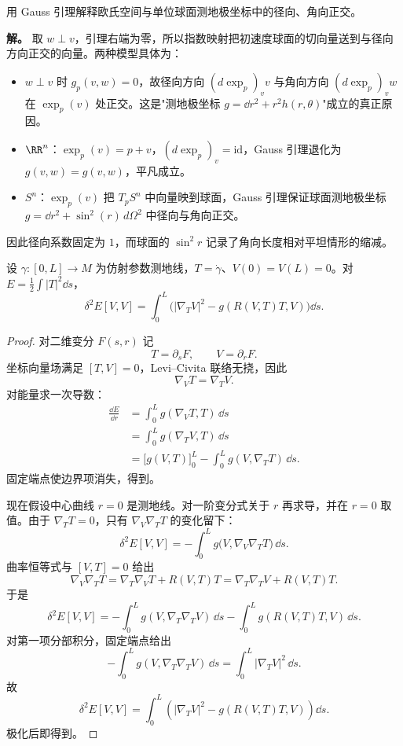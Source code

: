 \begin{exbox}
用 Gauss 引理解释欧氏空间与单位球面测地极坐标中的径向、角向正交。

\textbf{解。} 取 $w\perp v$，引理右端为零，所以指数映射把初速度球面的切向量送到与径向方向正交的向量。两种模型具体为：
\begin{itemize}
\item $w\perp v$ 时 $g_p(v,w)=0$，故径向方向 $(d\exp_p)_v v$ 与角向方向 $(d\exp_p)_v w$ 在 $\exp_p(v)$ 处正交。这是"测地极坐标 $g=\dd r^2+r^2 h(r,\theta)$"成立的真正原因。
\item $\RR^n$：$\exp_p(v)=p+v$，$(d\exp_p)_v=\mathrm{id}$，Gauss 引理退化为 $g(v,w)=g(v,w)$，平凡成立。
\item $S^n$：$\exp_p(v)$ 把 $T_pS^n$ 中向量映到球面，Gauss 引理保证球面测地极坐标 $g=\dd r^2+\sin^2(r)\,d\Omega^2$ 中径向与角向正交。
\end{itemize}

因此径向系数固定为 $1$，而球面的 $\sin^2r$ 记录了角向长度相对平坦情形的缩减。
\end{exbox}

\begin{proposition}[测地线能量的二阶变分]
设 $\gamma:[0,L]\to M$ 为仿射参数测地线，$T=\dot\gamma$、$V(0)=V(L)=0$。对 $E=\frac12\int|T|^2\dd s$，\[\delta^2E[V,V]=\int_0^L\bigl(|\nabla_TV|^2-g(R(V,T)T,V)\bigr)\dd s.\]
\end{proposition}

\begin{proof}
对二维变分 $F(s,r)$ 记
\[
T=\partial_sF,
\qquad
V=\partial_rF.
\]
坐标向量场满足 $[T,V]=0$，Levi--Civita 联络无挠，因此
\[
\nabla_VT=\nabla_TV.
\]
对能量求一次导数：
\[
\begin{aligned}
\frac{\dd E}{\dd r}
&=\int_0^L g(\nabla_VT,T)\,\dd s\\
&=\int_0^L g(\nabla_TV,T)\,\dd s\\
&=\bigl[g(V,T)\bigr]_0^L
-\int_0^L g(V,\nabla_TT)\,\dd s.
\end{aligned}
\]
固定端点使边界项消失，得到。

现在假设中心曲线 $r=0$ 是测地线。对一阶变分式关于 $r$ 再求导，并在 $r=0$ 取值。由于 $\nabla_TT=0$，只有 $\nabla_V\nabla_TT$ 的变化留下：
\[
\delta^2E[V,V]
=-\int_0^L g\bigl(V,\nabla_V\nabla_TT\bigr)\,\dd s.
\]
曲率恒等式与 $[V,T]=0$ 给出
\[
\nabla_V\nabla_TT
=\nabla_T\nabla_VT+R(V,T)T
=\nabla_T\nabla_TV+R(V,T)T.
\]
于是
\[
\delta^2E[V,V]
=-\int_0^L g(V,\nabla_T\nabla_TV)\,\dd s
-\int_0^L g(R(V,T)T,V)\,\dd s.
\]
对第一项分部积分，固定端点给出
\[
-\int_0^L g(V,\nabla_T\nabla_TV)\,\dd s
=\int_0^L|\nabla_TV|^2\,\dd s.
\]
故
\begin{equation}
{
\delta^2E[V,V]
=\int_0^L
\left(
|\nabla_TV|^2-g(R(V,T)T,V)
\right)\dd s.}
\label{eq:math-dg-energy-second-variation}
\end{equation}
极化后即得到。
\end{proof}

